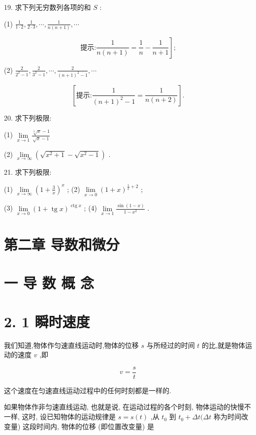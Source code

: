 \documentclass[10pt]{article}
\begin{document}
19. 求下列无穷数列各项的和 \(S\) :

(1) \(\frac{1}{1 \cdot 2},\frac{1}{2 \cdot 3},\cdots ,\frac{1}{n\left( {n + 1}\right) },\cdots\)

\[
\text{提示:}\left. {\frac{1}{n\left( {n + 1}\right) } = \frac{1}{n} - \frac{1}{n + 1}}\right\rbrack \text{;}
\]

(2) \(\frac{2}{{2}^{2} - 1},\frac{2}{{3}^{2} - 1},\cdots ,\frac{2}{{\left( n + 1\right) }^{2} - 1},\cdots\)

\[
\left\lbrack {\text{提示:}\frac{1}{{\left( n + 1\right) }^{2} - 1} = \frac{1}{n\left( {n + 2}\right) }}\right\rbrack \text{.}
\]

20. 求下列极限:

(1) \(\mathop{\lim }\limits_{{x \rightarrow 1}}\frac{\sqrt[3]{x} - 1}{\sqrt{x} - 1}\)

(2) \(\mathop{\lim }\limits_{{x \rightarrow \infty }}\left( {\sqrt{{x}^{2} + 1} - \sqrt{{x}^{2} - 1}}\right)\) .

21. 求下列极限:

(1) \(\mathop{\lim }\limits_{{x \rightarrow \infty }}{\left( 1 + \frac{3}{x}\right) }^{x}\) ; (2) \(\mathop{\lim }\limits_{{x \rightarrow 0}}{\left( 1 + x\right) }^{\frac{1}{x} + 2}\) ;

(3) \(\mathop{\lim }\limits_{{x \rightarrow 0}}{\left( 1 + \operatorname{tg}x\right) }^{\operatorname{ctg}x}\) ; (4) \(\mathop{\lim }\limits_{{x \rightarrow 1}}\frac{\sin \left( {1 - x}\right) }{1 - {x}^{2}}\) .

\section*{第二章 导数和微分}

\section*{一 导 数 概 念}

\section*{2. 1 瞬时速度}

我们知道,物体作匀速直线运动时,物体的位移 \(s\) 与所经过的时间 \(t\) 的比,就是物体运动的速度 \(v\) ,即

\[
v = \frac{s}{t}
\]

这个速度在匀速直线运动过程中的任何时刻都是一样的.

如果物体作非匀速直线运动, 也就是说, 在运动过程的各个时刻, 物体运动的快慢不一样, 这时, 设已知物体的运动规律是 \(s = s\left( t\right)\) ,从 \({t}_{0}\) 到 \({t}_{0} + {\Delta t}({\Delta t}\) 称为时间改变量) 这段时间内, 物体的位移 (即位置改变量) 是
\end{document}
